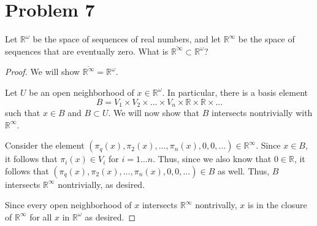 \documentclass[fontsize=11pt]{scrartcl} %
\numberwithin{equation}{section} %
\numberwithin{figure}{section} %
\numberwithin{table}{section} %
\newcommand{\R}{\mathbb{R}}
\begin{document}
\section*{Problem 7}
Let $\R^{\omega}$ be the space of sequences of real numbers, and let $\R^{\infty}$ be
the space of sequences that are eventually zero. What is $\overline{\R^{\infty}}\subset\R^{\omega}$?
\\
\begin{proof}
We will show $\overline{\R^{\infty}} = \R^{\omega}$.

Let $U$ be an open neighborhood of $x\in\R^{\omega}$. In particular, there is a basis element
\[
B = V_1\times V_2\times\ldots\times V_n\times \R\times \R\times\ldots
\]
such that $x\in B$ and $B\subset U$. We will now show that $B$ intersects nontrivially
with $\R^{\infty}$.

Consider the element $(\pi_q(x),\pi_2(x),\ldots,\pi_n(x),0,0,\ldots)\in\R^{\infty}$.
Since $x\in B$, it follows that $\pi_i(x)\in V_i$ for $i=1\ldots n$. Thus, since we also know
that $0\in\R$, it follows that $(\pi_q(x),\pi_2(x),\ldots,\pi_n(x),0,0,\ldots)\in B$ as well.
Thus, $B$ intersects $\R^{\infty}$ nontrivially, as desired.

Since every open neighborhood of $x$ intersects $\R^{\infty}$ nontrivally, $x$ is in the closure
of $\R^{\infty}$ for all $x$ in $\R^{\omega}$ as desired.
\end{proof}
\end{document}
